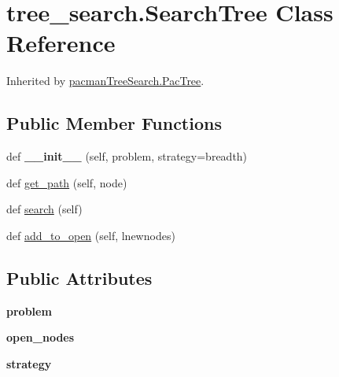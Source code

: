 \hypertarget{classtree__search_1_1_search_tree}{}\section{tree\+\_\+search.\+Search\+Tree Class Reference}
\label{classtree__search_1_1_search_tree}


Inherited by \hyperlink{classpacman_tree_search_1_1_pac_tree}{pacman\+Tree\+Search.\+Pac\+Tree}.

\subsection*{Public Member Functions}
\begin{DoxyCompactItemize}
\item 
\mbox{\label{classtree__search_1_1_search_tree_a8f4e29a6d0bbb10f08eeed94041381eb}} 
def {\bfseries \+\_\+\+\_\+init\+\_\+\+\_\+} (self, problem, strategy=\textquotesingle{}breadth\textquotesingle{})
\item 
def \hyperlink{classtree__search_1_1_search_tree_aef56c7770db06ff48c0687e1536a13ed}{get\+\_\+path} (self, node)
\item 
def \hyperlink{classtree__search_1_1_search_tree_ac37d7c8abc0ab14a304ff0272b2094af}{search} (self)
\item 
def \hyperlink{classtree__search_1_1_search_tree_af851718191e999db984ffba08146b215}{add\+\_\+to\+\_\+open} (self, lnewnodes)
\end{DoxyCompactItemize}
\subsection*{Public Attributes}
\begin{DoxyCompactItemize}
\item 
\mbox{\label{classtree__search_1_1_search_tree_aa8f7781eccef8769c28f461ab71aeae0}} 
{\bfseries problem}
\item 
\mbox{\label{classtree__search_1_1_search_tree_ad77269b97702db0321da63377013ea50}} 
{\bfseries open\+\_\+nodes}
\item 
\mbox{\label{classtree__search_1_1_search_tree_a3c26deb971f60285477a6e9c912ab464}} 
{\bfseries strategy}
\end{DoxyCompactItemize}


